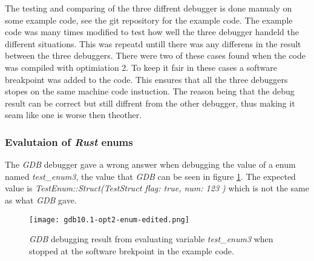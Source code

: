 

The testing and comparing of the three diffrent debugger is done manualy on some example code, see the git repository \cite{example-code} for the example code.
The example code was many times modified to test how well the three debugger handeld the different situations.
This was repeatd untill there was any differens in the result between the three debuggers.
There were two of these cases found when the code was compiled with optimiation 2.
To keep it fair in these cases a software breakpoint was added to the code.
This ensures that all the three debuggers stopes on the same machine code instuction.
The reason being that the debug result can be correct but still diffrent from the other debugger, thus making it seam like one is worse then theother.


\subsubsection{Evalutaion of \emph{Rust} enums}
The \emph{GDB} debugger gave a wrong answer when debugging the value of a enum named \emph{test\_enum3}, the value that \emph{GDB} can be seen in figure \ref{fig:gdbenum}.
The expected value is \emph{TestEnum::Struct(TestStruct { flag: true, num: 123 })} which is not the same as what \emph{GDB} gave.


\begin{figure}[h]
	\centering
	\texttt{[image: gdb10.1-opt2-enum-edited.png]}
	\caption{\emph{GDB} debugging result from evaluating variable \emph{test\_enum3} when stopped at the software brekpoint in the example code.}
	\label{fig:gdbenum}
\end{figure}


